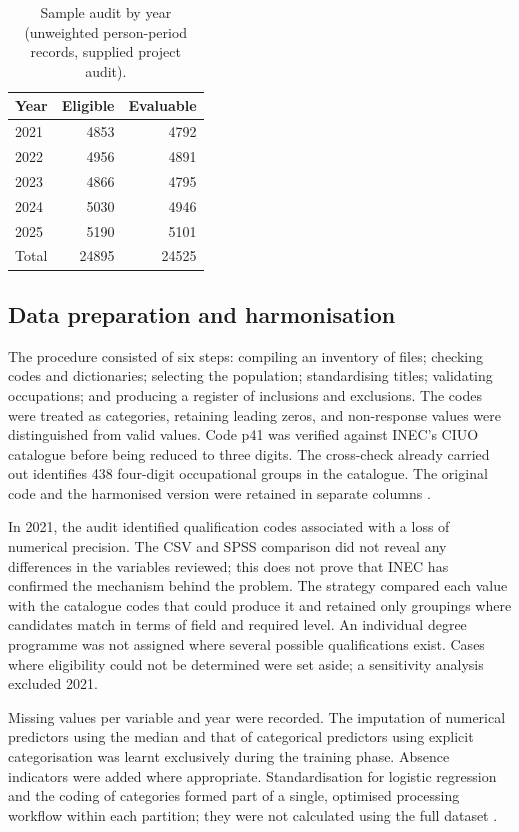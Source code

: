 \begin{table}[htbp]
\caption{Sample audit by year (unweighted person-period records, supplied project audit).\label{tab:audit}}
\centering\begin{tabular}{lrr}\toprule Year & Eligible & Evaluable \\ \midrule
2021 & 4853 & 4792 \\ 2022 & 4956 & 4891 \\ 2023 & 4866 & 4795 \\ 2024 & 5030 & 4946 \\ 2025 & 5190 & 5101 \\ \midrule Total & 24895 & 24525 \\ \bottomrule\end{tabular}
\end{table}

\subsection{Data preparation and harmonisation}



The procedure consisted of six steps: compiling an inventory of files; checking codes and dictionaries; selecting the population; standardising titles; validating occupations; and producing a register of inclusions and exclusions. The codes were treated as categories, retaining leading zeros, and non-response values were distinguished from valid values. Code p41 was verified against INEC's CIUO catalogue before being reduced to three digits. The cross-check already carried out identifies 438 four-digit occupational groups in the catalogue. The original code and the harmonised version were retained in separate columns \cite{Office2012}.

In 2021, the audit identified qualification codes associated with a loss of numerical precision. The CSV and SPSS comparison did not reveal any differences in the variables reviewed; this does not prove that INEC has confirmed the mechanism behind the problem. The strategy compared each value with the catalogue codes that could produce it and retained only groupings where candidates match in terms of field and required level. An individual degree programme was not assigned where several possible qualifications exist. Cases where eligibility could not be determined were set aside; a sensitivity analysis excluded 2021.

Missing values per variable and year were recorded. The imputation of numerical predictors using the median and that of categorical predictors using explicit categorisation was learnt exclusively during the training phase. Absence indicators were added where appropriate. Standardisation for logistic regression and the coding of categories formed part of a single, optimised processing workflow within each partition; they were not calculated using the full dataset \cite{James2023,Kapoor2023}.

